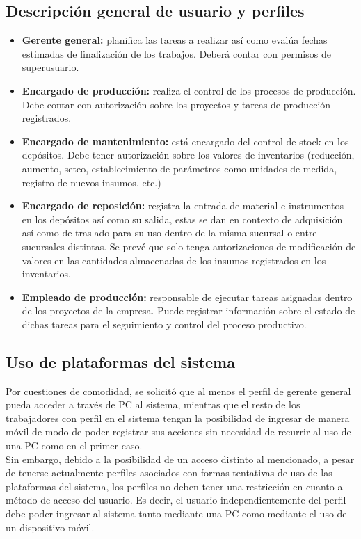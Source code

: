\documentclass[a4paper, 12pt,twoside]{report}  %
\numberwithin{equation}{subsection} %
\begin{document}
\subsection{Descripción general de usuario y perfiles}

\begin{itemize}
\item \textbf{Gerente general:} planifica las tareas a realizar así como evalúa fechas estimadas de finalización de los trabajos. Deberá contar con permisos de superusuario.
\item \textbf{Encargado de producción:} realiza el control de los procesos de producción. Debe contar con autorización sobre los proyectos y tareas de producción registrados.
\item \textbf{Encargado de mantenimiento:} está encargado del control de stock en los depósitos. Debe tener autorización sobre los valores de inventarios (reducción, aumento, seteo, establecimiento de parámetros como unidades de medida, registro de nuevos insumos, etc.)
\item \textbf{Encargado de reposición:} registra la entrada de material e instrumentos en los depósitos así como su salida, estas se dan en contexto de adquisición así como de traslado para su uso dentro de la misma sucursal o entre sucursales distintas. Se prevé que solo tenga autorizaciones de modificación de valores en las cantidades almacenadas de los insumos registrados en los inventarios.
\item \textbf{Empleado de producción:}
responsable de ejecutar tareas asignadas dentro de los proyectos de la empresa. Puede registrar información sobre el estado de dichas tareas para el seguimiento y control del proceso productivo.
\end{itemize}

\subsection{Uso de plataformas del sistema} Por cuestiones de comodidad, se solicitó que al menos el perfil de gerente general pueda acceder a través de PC al sistema, mientras que el resto de los trabajadores con perfil en el sistema tengan la posibilidad de ingresar de manera móvil de modo de poder registrar sus acciones sin necesidad de recurrir al uso de una PC como en el primer caso.\\
\indent Sin embargo, debido a la posibilidad de un acceso distinto al mencionado, a pesar de tenerse actualmente perfiles asociados con formas tentativas de uso de las plataformas del sistema, los perfiles no deben tener una restricción en cuanto a método de acceso del usuario. Es decir, el usuario independientemente del perfil debe poder ingresar al sistema tanto mediante una PC como mediante el uso de un dispositivo móvil.
\end{document}
